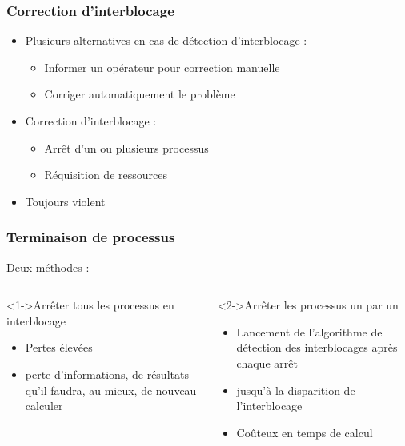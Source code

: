 \begin{frame}
\frametitle{Correction d’interblocage}
\begin{itemize}
\item Plusieurs alternatives en cas de détection d’interblocage :
\begin{itemize}
\item Informer un opérateur pour correction manuelle
\item Corriger automatiquement le problème
\end{itemize}
\item Correction d’interblocage :
\begin{itemize}
\item Arrêt d’un ou plusieurs processus
\item Réquisition de ressources
\end{itemize}
\item Toujours violent
\end{itemize}
\end{frame}

\begin{frame}
\frametitle{Terminaison de processus}
Deux méthodes :
\begin{columns}
\begin{block}<1->{Arrêter tous les processus en interblocage}
\begin{itemize}
\item Pertes élevées
\item perte d’informations, de résultats qu’il faudra, au mieux, de nouveau calculer
\end{itemize}
\end{block}
\begin{block}<2->{Arrêter les processus un par un}
\begin{itemize}
\item Lancement de l’algorithme de détection des interblocages après chaque arrêt
\item jusqu’à la disparition de l’interblocage
\item Coûteux en temps de calcul
\end{itemize}
\end{block}
\end{columns}
\end{frame}

